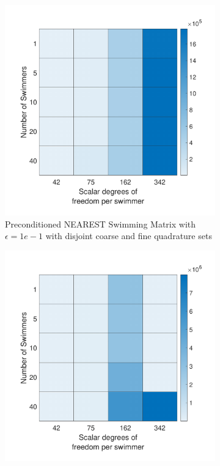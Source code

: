 \begin{figure}
\ContinuedFloat
    \begin{subfigure}{0.3\textwidth}
        \includegraphics[width=\linewidth]{Images/Condition/Mobility Matrix using Disjoint NEAREST Preconditioned-1.pdf}
        \caption{Preconditioned NEAREST Swimming Matrix with $\epsilon=1e-1$ with disjoint coarse and fine quadrature sets}    
    \end{subfigure}
    \begin{subfigure}{0.3\textwidth}
        \includegraphics[width=\linewidth]{Images/Condition/Mobility Matrix using Disjoint NEAREST Preconditioned-2.pdf}

\end{subfigure}
\end{figure}

